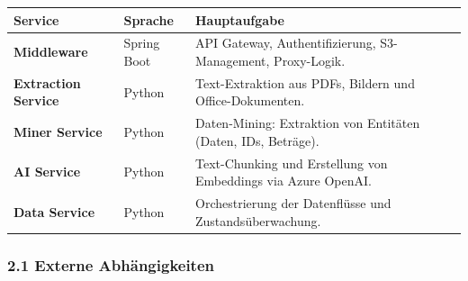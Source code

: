{\def\LTcaptype{none} %
\begin{longtable}[]{@{}
  >{\raggedright\arraybackslash}p{}
  >{\raggedright\arraybackslash}p{}
  >{\raggedright\arraybackslash}p{}@{}}
\toprule\noalign{}
\begin{minipage}[b]{\linewidth}\raggedright
Service
\end{minipage} & \begin{minipage}[b]{\linewidth}\raggedright
Sprache
\end{minipage} & \begin{minipage}[b]{\linewidth}\raggedright
Hauptaufgabe
\end{minipage} \\
\midrule\noalign{}
\endhead
\bottomrule\noalign{}
\endlastfoot
\textbf{Middleware} & Spring Boot & API Gateway, Authentifizierung,
S3-Management, Proxy-Logik. \\
\textbf{Extraction Service} & Python & Text-Extraktion aus PDFs, Bildern
und Office-Dokumenten. \\
\textbf{Miner Service} & Python & Daten-Mining: Extraktion von Entitäten
(Daten, IDs, Beträge). \\
\textbf{AI Service} & Python & Text-Chunking und Erstellung von
Embeddings via Azure OpenAI. \\
\textbf{Data Service} & Python & Orchestrierung der Datenflüsse und
Zustandsüberwachung. \\
\end{longtable}
}

\subsubsection{2.1 Externe
Abhängigkeiten}\label{externe-abhuxe4ngigkeiten}

